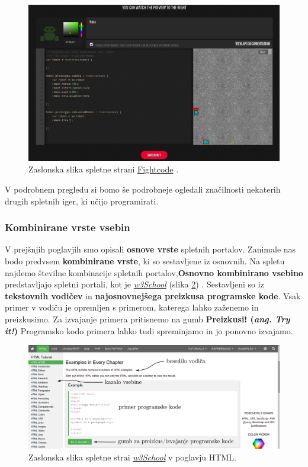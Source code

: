 \begin{figure}[h!]
    \includegraphics [width=1\linewidth, keepaspectratio =
    1] {./images/sc_web/fightRobot_01.jpg}
    \caption{Zaslonska slika spletne strani
      {\href{http://fightcodegame.com/}{Fightcode}}
      \cite{web:fightcode}.}
    \label{fig:fightcode}
\end{figure}

V podrobnem pregledu si bomo še podrobneje ogledali značilnosti nekaterih drugih
spletnih iger, ki učijo programirati.

\subsubsection{Kombinirane vrste vsebin}
\label{sec:kombinirane_vrste_vsebin}

V prejšnjih poglavjih smo opisali \textbf{osnove vrste} spletnih
portalov. Zanimale nas bodo predvsem \textbf{kombinirane vrste}, ki so
sestavljene iz osnovnih. Na spletu najdemo številne kombinacije
spletnih portalov,\textbf{Osnovno kombinirano vsebino} predstavljajo
spletni portali, kot je
\emph{\href{http://www.w3schools.com/}{w3School}} (slika
\ref{fig:scr:web:w3school}) \cite{web:w3school}. Sestavljeni so iz
\textbf{tekstovnih vodičev} in \textbf{najosnovnejšega preizkusa
  programske kode}. Vsak primer v vodiču je opremljen s primerom,
katerega lahko zaženemo in preizkusimo. Za izvajanje primera
pritisnemo na gumb \textbf{Preizkusi!  (\emph{ang. Try it!})}
Programsko kodo primera lahko tudi spreminjamo in jo ponovno izvajamo.

\begin{figure}[h!]
    \includegraphics [width=1\linewidth, keepaspectratio =
    1] {./images/sc_web/w3school.jpg}
    \caption{Zaslonska slika spletne strai
      \emph{\href{http://www.w3schools.com/}{w3School}}
      \cite{web:w3school} v poglavju HTML.}
    \label{fig:scr:web:w3school}
\end{figure}

